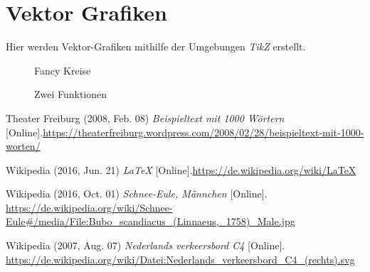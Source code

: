 \documentclass{scrreprt}
\begin{document}
\newpage

\chapter{Vektor Grafiken}
Hier werden Vektor-Grafiken mithilfe der Umgebungen \textit{TikZ} erstellt.
\vspace{5pt} \\
\begin{figure}[h!]
\caption{Fancy Kreise}
\end{figure}
\begin{figure}[h!]
	\centering
{}
\caption{Zwei Funktionen}
\end{figure}




\newpage

\begin{thebibliography}{mmmmmmm}
	 Theater Freiburg (2008, Feb. 08) \textit{Beispieltext mit 1000 Wörtern} [Online].\newline \url{https://theaterfreiburg.wordpress.com/2008/02/28/beispieltext-mit-1000-worten/} 
	
	 Wikipedia (2016, Jun. 21) \textit{LaTeX} [Online].\newline \url{https://de.wikipedia.org/wiki/LaTeX} 
	
	 Wikipedia (2016, Oct. 01) \textit{Schnee-Eule, Männchen} [Online]. \newline
	\url{https://de.wikipedia.org/wiki/Schnee-Eule#/media/File:Bubo_scandiacus_(Linnaeus,_1758)_Male.jpg}
	
	 Wikipedia (2007, Aug. 07) \textit{Nederlands verkeersbord C4} [Online]. \newline
	\url{https://de.wikipedia.org/wiki/Datei:Nederlands_verkeersbord_C4_(rechts).svg}
	
	
	
\end{thebibliography}
\end{document}
